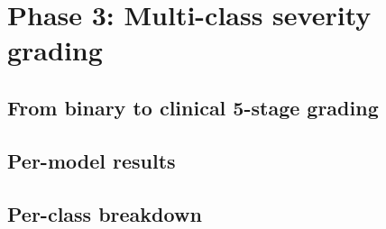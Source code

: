 \chapter{Phase 3: Multi-class severity grading}
\label{ch:phase3}


\section{From binary to clinical 5-stage grading}

\section{Per-model results}



\section{Per-class breakdown}


%

